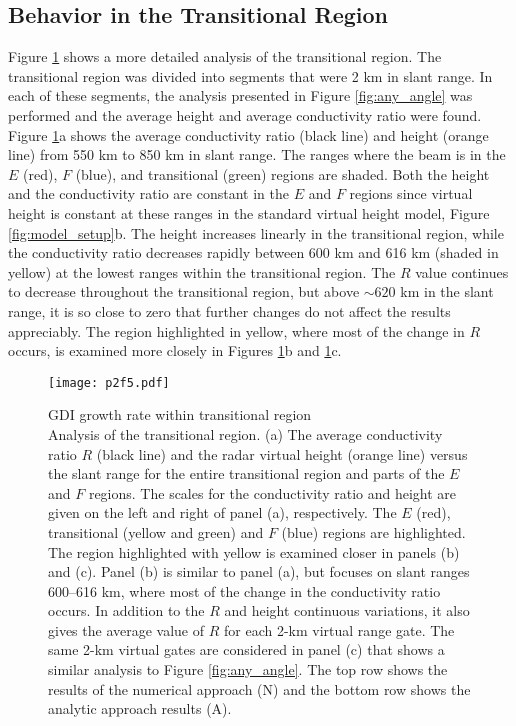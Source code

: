 \subsection{Behavior in the Transitional Region}
Figure \ref{fig:transitional} shows a more detailed analysis of the transitional region.  The transitional region was divided into segments that were 2 km in slant range. In each of these segments, the analysis presented in Figure \ref{fig:any_angle} was performed and the average height and average conductivity ratio were found.  Figure \ref{fig:transitional}a shows the average conductivity ratio (black line) and height (orange line) from 550 km to 850 km in slant range.  The ranges where the beam is in the \(E\) (red), \(F\) (blue), and transitional (green) regions are shaded. Both the height and the conductivity ratio are constant in the \(E\) and \(F\) regions since virtual height is constant at these ranges in the standard virtual height model, Figure \ref{fig:model_setup}b. The height increases linearly in the transitional region, while the conductivity ratio decreases rapidly between 600 km and 616 km (shaded in yellow) at the lowest ranges within the transitional region. The \(R\) value continues to decrease throughout the transitional region, but above \(\sim620\) km in the slant range, it is so close to zero that further changes do not affect the results appreciably.  The region highlighted in yellow, where most of the change in \(R\) occurs, is examined more closely in Figures \ref{fig:transitional}b and \ref{fig:transitional}c.

\begin{figure}
	\centering
	\texttt{[image: p2f5.pdf]}
	\caption[GDI growth rate within transitional region]{{\:}GDI growth rate within transitional region\\ Analysis of the transitional region.  (a) The average conductivity ratio \(R\) (black line) and the radar virtual height (orange line) versus the slant range for the entire transitional region and parts of the \(E\) and \(F\) regions. The scales for the conductivity ratio and height are given on the left and right of panel (a), respectively.  The \(E\) (red), transitional (yellow and green) and \(F\) (blue) regions are highlighted.  The region highlighted with yellow is examined closer in panels (b) and (c).  Panel (b) is similar to panel (a), but focuses on slant ranges 600--616 km, where most of the change in the conductivity ratio occurs.  In addition to the \(R\) and height continuous variations, it also gives the average value of \(R\) for each 2-km virtual range gate. The same 2-km virtual gates are considered in panel (c) that shows a similar analysis to Figure \ref{fig:any_angle}. The top row shows the results of the numerical approach (N) and the bottom row shows the analytic approach results (A).}
	\label{fig:transitional}
\end{figure}



